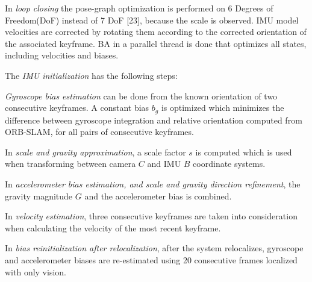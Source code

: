 In \textit{loop closing} the pose-graph optimization is performed on 6 Degrees of Freedom(DoF) instead of 7 DoF [23], because the scale is observed.  IMU model velocities are corrected by rotating them according to the corrected orientation of the associated keyframe.  BA in a parallel thread is done that optimizes all states, including velocities and biases. 

The \textit{IMU initialization} has the following steps:


\textit{Gyroscope bias estimation} can be done from the known orientation of two consecutive keyframes. A constant bias $b_g$ is optimized which minimizes the difference between gyroscope integration and relative orientation computed from ORB-SLAM, for all pairs of consecutive keyframes.

In \textit{scale and gravity approximation}, a scale  factor $s$ is computed which is used when transforming between camera $C$ and IMU $B$ coordinate systems.

In \textit{accelerometer bias estimation, and scale and gravity direction refinement}, the gravity magnitude $G$ and the accelerometer bias is combined.

In \textit{velocity estimation}, three consecutive keyframes are taken into consideration when calculating the velocity of the most recent keyframe.

In \textit{bias reinitialization after relocalization}, after the system relocalizes, gyroscope and accelerometer biases are re-estimated using 20 consecutive frames localized with only vision.



\FloatBarrier

